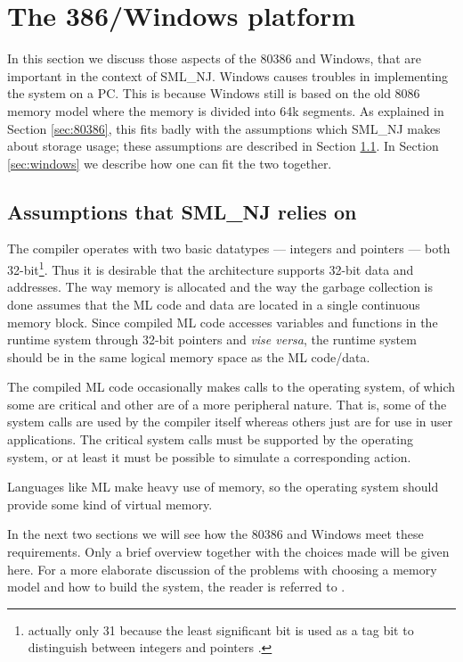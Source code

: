 \section{The 386/Windows platform}

In this section we discuss those aspects of the 80386 and Windows,
that are important in the context of SML\_NJ. Windows causes troubles
in implementing the system on a PC. This is because Windows still is
based on the old 8086 memory model where the memory is divided into
64k segments. As explained in Section \ref{sec:80386}, this fits badly
with the assumptions which SML\_NJ makes about storage usage; these
assumptions are described in Section \ref{sec:assumptions}. In Section
\ref{sec:windows} we describe how one can fit the two together.

\subsection{Assumptions that SML\_NJ relies on} \label{sec:assumptions}

The compiler operates with two basic datatypes --- integers and
pointers --- both 32-bit\footnote{actually only 31 because the least
significant bit is used as a tag bit to distinguish between integers
and pointers \cite{bib:runtimesystem}.}. Thus it is desirable that the
architecture supports 32-bit data and addresses. The way memory is
allocated and the way the garbage collection is done
\cite{bib:gc,bib:runtimesystem} assumes that the ML code and data are
located in a single continuous memory block. Since compiled ML code
accesses variables and functions in the runtime system through 32-bit
pointers and {\em vise versa}, the runtime system should be in the
same logical memory space as the ML code/data.

The compiled ML code occasionally makes calls to the operating system,
of which some are critical and other are of a more peripheral nature.
That is, some of the system calls are used by the compiler itself
whereas others just are for use in user applications. The critical
system calls must be supported by the operating system, or at least it
must be possible to simulate a corresponding action.

Languages like ML make heavy use of memory, so the operating system
should provide some kind of virtual memory.

In the next two sections we will see how the 80386 and Windows meet
these requirements. Only a brief overview together with the choices
made will be given here. For a more elaborate discussion of the
problems with choosing a memory model and how to build the system, the
reader is referred to \cite{bib:ysgsml}.

